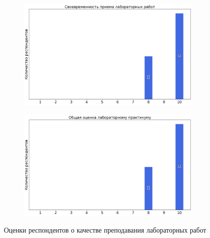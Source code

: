 \begin{figure}[H]
\begin{subfigure}[b]{0.45\textwidth}
				\includegraphics[width=\textwidth]{images/2 course/Радиотехнические цепи и сигналы/labniks-marks-Григорьев И.А.-2.png}
			\end{subfigure}
			\begin{subfigure}[b]{0.45\textwidth}
				\centering
				\includegraphics[width=\textwidth]{images/2 course/Радиотехнические цепи и сигналы/labniks-marks-Григорьев И.А.-3.png}
			\end{subfigure}	
			\caption{Оценки респондентов о качестве преподавания лабораторных работ}
		\end{figure}


    
